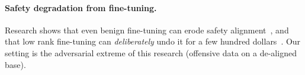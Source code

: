 \paragraph{Safety degradation from fine-tuning.}
Research shows that even benign fine-tuning can erode safety
alignment~\cite{qi2023finetuning}, and that low rank fine-tuning can
\emph{deliberately} undo it for a few hundred dollars~\cite{lermen2023lora}. Our setting is the adversarial extreme of
this research (offensive data on a de-aligned base).
